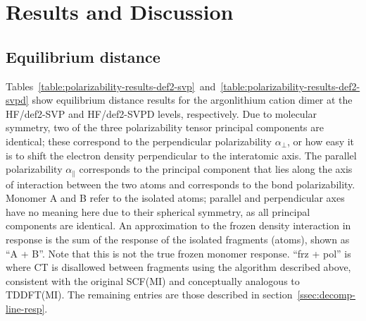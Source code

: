 \section{Results and Discussion}
\label{sec:results-and-discussion}

\subsection{Equilibrium distance}
\label{ssec:results-equilibrium-distance}

\begin{table}
  
  \caption[Argon\textemdash{}lithium cation dimer polarizabilities using HF/def2-SVP]{Polarizability results for the argon\textemdash{}lithium cation dimer at the HF/def2-SVP level. The geometry is optimized at the same level. All values have units of \aud{}.}
  \label{table:polarizability-results-def2-svp}
\end{table}

\begin{table}
  
  \caption[Argon\textemdash{}lithium cation dimer polarizabilities using HF/def2-SVPD]{Polarizability results for the argon\textemdash{}lithium cation dimer at the HF/def2-SVPD level. The geometry is optimized at the same level. All values have units of \aud{}.}
  \label{table:polarizability-results-def2-svpd}
\end{table}

Tables~\ref{table:polarizability-results-def2-svp}~and~\ref{table:polarizability-results-def2-svpd} show equilibrium distance results for the argon\textemdash{}lithium cation dimer at the HF/def2-SVP and HF/def2-SVPD levels, respectively. Due to molecular symmetry, two of the three polarizability tensor principal components are identical; these correspond to the perpendicular polarizability \(\alpha_{\perp}\), or how easy it is to shift the electron density perpendicular to the interatomic axis. The parallel polarizability \(\alpha_{\parallel}\) corresponds to the principal component that lies along the axis of interaction between the two atoms and corresponds to the bond polarizability. Monomer A and B refer to the isolated atoms; parallel and perpendicular axes have no meaning here due to their spherical symmetry, as all principal components are identical. An approximation to the frozen density interaction in response is the sum of the response of the isolated fragments (atoms), shown as ``A + B''. Note that this is not the true frozen monomer response\cite{Mao_2017_5944}. ``frz + pol'' is where CT is disallowed between fragments using the algorithm described above, consistent with the original SCF(MI) and conceptually analogous to TDDFT(MI). The remaining entries are those described in section~\ref{ssec:decomp-line-resp}.

